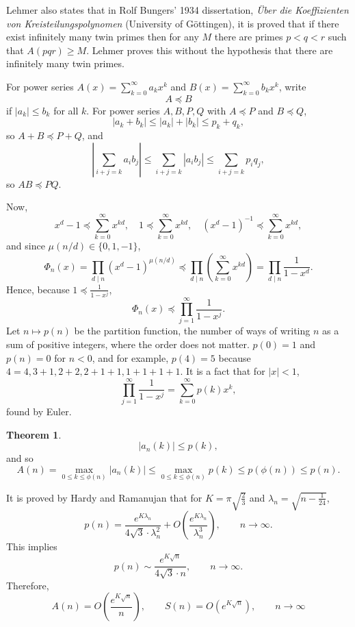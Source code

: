 \documentclass{article}
\theoremstyle{definition}
\newtheorem{theorem}{Theorem}
\theoremstyle{definition}
\begin{document}
Lehmer also states that in Rolf Bungers' 1934 dissertation, {\em \"Uber die Koeffizienten von Kreisteilungspolynomen} (University of G\"ottingen), 
it is proved that if there exist infinitely many twin primes then 
for any $M$ there are primes $p<q<r$ such that $A(pqr) \geq M$. Lehmer proves this without
the hypothesis that there are infinitely many twin primes.



For power series $A(x) = \sum_{k=0}^\infty a_k x^k$ and $B(x)=\sum_{k=0}^\infty b_k x^k$, write
\[
A \preceq B
\]
if $|a_k| \leq b_k$ for all $k$.
For power series $A,B,P,Q$ with $A \preceq P$ and $B \preceq Q$,
\[
|a_k+b_k| \leq |a_k|+|b_k| \leq p_k+q_k,
\]
so $A+B \preceq P+Q$, and
\[
\left| \sum_{i+j=k} a_i b_j \right| \leq \sum_{i+j=k} |a_i b_j|
\leq \sum_{i+j=k} p_i q_j,
\]
so $AB \preceq PQ$. 

Now,  
\[
x^d-1 \preceq \sum_{k=0}^\infty x^{kd},
\quad 1 \preceq \sum_{k=0}^\infty x^{kd},
\quad (x^d-1)^{-1} \preceq \sum_{k=0}^\infty x^{kd},
\]
 and since $\mu(n/d) \in \{0,1,-1\}$,
\begin{equation}
\Phi_n(x) = \prod_{d \mid n} (x^d-1)^{\mu(n/d)}
\preceq
\prod_{d \mid n} \left( \sum_{k=0}^\infty x^{kd} \right)
=\prod_{d \mid n} \frac{1}{1-x^d}.
\label{dproduct}
\end{equation}
Hence, because $1 \preceq \frac{1}{1-x^j}$,
\[
\Phi_n(x)  
\preceq \prod_{j=1}^\infty \frac{1}{1-x^j}.
\]
Let $n \mapsto p(n)$ be the partition function, the number of ways of writing
$n$ as a sum of positive integers, where the order does not matter. $p(0)=1$ and $p(n)=0$ for $n<0$, and
for example, $p(4)=5$ because $4=4,3+1,2+2,2+1+1,1+1+1+1$. It is a  fact that for $|x|<1$,
\[
 \prod_{j=1}^\infty \frac{1}{1-x^j} = \sum_{k=0}^\infty p(k) x^k,
\]
found by Euler.

\begin{theorem}
\[
|a_n(k)| \leq p(k),
\]
and so 
\[
A(n) = \max_{0 \leq k \leq \phi(n)} |a_n(k)| \leq
\max_{0 \leq k \leq \phi(n)} p(k)
\leq p(\phi(n)) \leq p(n).
\]
\label{partition}
\end{theorem}

It is proved by Hardy and Ramanujan \cite[p.~166, Chapter VII]{chandra} that
for $K=\pi \sqrt{\frac{2}{3}}$ and $\lambda_n = \sqrt{n-\frac{1}{24}}$, 
\[
p(n) = \frac{e^{K\lambda_n}}{4\sqrt{3}\cdot \lambda_n^2} + O\left( \frac{e^{K\lambda_n}}{\lambda_n^3}\right),
\qquad n \to \infty.
\]
This implies 
\[
p(n) \sim \frac{e^{K \sqrt{n}}}{4\sqrt{3} \cdot n}, \qquad n \to \infty.
\]
Therefore,
\[
A(n) = O\left(\frac{e^{K\sqrt{n}}}{n}\right),\qquad
S(n) = O(e^{K\sqrt{n}}),
\qquad n \to \infty
\]
\end{document}
